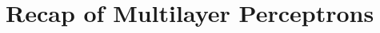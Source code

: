 \section{Recap of Multilayer Perceptrons}
\label{sec:mlp_backprop:recap_of_multilayer_perceptrons}

